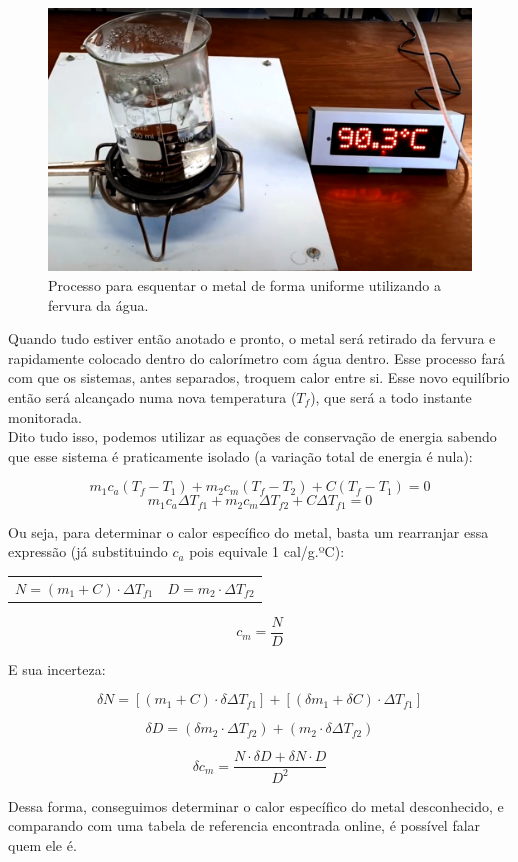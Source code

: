 \begin{figure}[H]
  \centering
  \includegraphics[scale=0.3]{images/fervura-dagua.png}
  \caption{Processo para esquentar o metal de forma uniforme utilizando a fervura da água.}
\end{figure}

Quando tudo estiver então anotado e pronto, o metal será retirado da fervura e rapidamente colocado dentro do calorímetro com água dentro. Esse processo fará com que os sistemas, antes separados, troquem calor entre si. Esse novo equilíbrio então será alcançado numa nova temperatura ($T_f$), que será a todo instante monitorada.\\

Dito tudo isso, podemos utilizar as equações de conservação de energia sabendo que esse sistema é praticamente isolado (a variação total de energia é nula):

\[ m_1 c_a (T_f - T_1) + m_2 c_m (T_f - T_2) + C (T_f - T_1) = 0 \]
\[ m_1 c_a \Delta T_{f1} + m_2 c_m \Delta T_{f2} + C \Delta T_{f1} = 0 \]

Ou seja, para determinar o calor específico do metal, basta um rearranjar essa expressão (já substituindo $c_a$ pois equivale 1 cal/g.ºC):

\begin{table}[H]
    \centering
    \begin{tabular}{ c||c  }
         $N = (m_1 + C) \cdot \Delta T_{f1}$ &
         $D = m_2 \cdot \Delta T_{f2}$
    \end{tabular}
\end{table}

\[ c_m = \frac{N}{D} \]

E sua incerteza:

\[ \delta N = [(m_1 + C) \cdot \delta \Delta T_{f1}] + [(\delta m_1 + \delta C) \cdot \Delta T_{f1}] \]

\[ \delta D = (\delta m_2 \cdot \Delta T_{f2}) + (m_2 \cdot \delta \Delta T_{f2}) \]

\[ \delta c_m = \frac{N \cdot \delta D + \delta N \cdot D}{D^2} \]

Dessa forma, conseguimos determinar o calor específico do metal desconhecido, e comparando com uma tabela de referencia encontrada online, é possível falar quem ele é.
